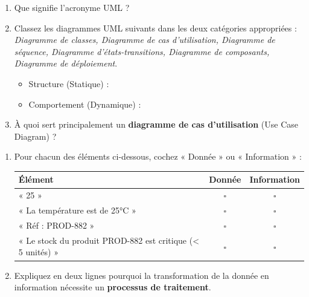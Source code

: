 \documentclass[11pt]{article}
\begin{document}
\begin{exercice}
\begin{enumerate}
    \item Que signifie l'acronyme UML ?
    \item Classez les diagrammes UML suivants dans les deux catégories appropriées : \textit{Diagramme de classes, Diagramme de cas d'utilisation, Diagramme de séquence, Diagramme d'états-transitions, Diagramme de composants, Diagramme de déploiement}.
    \begin{itemize}
        \item Structure (Statique) :
        \item Comportement (Dynamique) :
    \end{itemize}
    \item À quoi sert principalement un \textbf{diagramme de cas d'utilisation} (Use Case Diagram) ?
\end{enumerate}
\end{exercice}

\begin{exercice}
\begin{enumerate}
    \item Pour chacun des éléments ci-dessous, cochez « Donnée » ou « Information » :
    \begin{tabular}{|l|c|c|}
    \hline
    \textbf{Élément} & \textbf{Donnée} & \textbf{Information} \\ \hline
    « 25 » & $\square$ & $\square$ \\ \hline
    « La température est de 25°C » & $\square$ & $\square$ \\ \hline
    « Réf : PROD-882 » & $\square$ & $\square$ \\ \hline
    « Le stock du produit PROD-882 est critique (< 5 unités) » & $\square$ & $\square$ \\ \hline
    \end{tabular}
    \item Expliquez en deux lignes pourquoi la transformation de la donnée en information nécessite un \textbf{processus de traitement}.
\end{enumerate}
\end{exercice}
\end{document}
